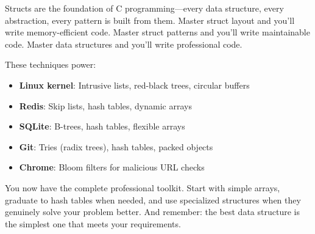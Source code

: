\begin{tipbox}
Structs are the foundation of C programming—every data structure, every abstraction, every pattern is built from them. Master struct layout and you'll write memory-efficient code. Master struct patterns and you'll write maintainable code. Master data structures and you'll write professional code.

These techniques power:
\begin{itemize}
    \item \textbf{Linux kernel}: Intrusive lists, red-black trees, circular buffers
    \item \textbf{Redis}: Skip lists, hash tables, dynamic arrays
    \item \textbf{SQLite}: B-trees, hash tables, flexible arrays
    \item \textbf{Git}: Tries (radix trees), hash tables, packed objects
    \item \textbf{Chrome}: Bloom filters for malicious URL checks
\end{itemize}

You now have the complete professional toolkit. Start with simple arrays, graduate to hash tables when needed, and use specialized structures when they genuinely solve your problem better. And remember: the best data structure is the simplest one that meets your requirements.
\end{tipbox}
